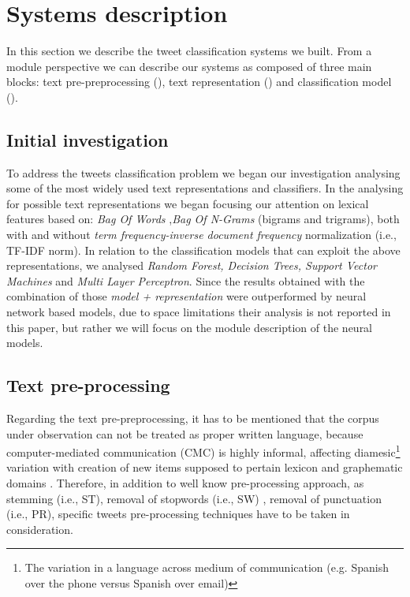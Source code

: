 \section{Systems description} \label{sec:system}

In this section we describe the tweet classification systems we built. From a module perspective we can describe our systems as composed of three main blocks: text pre-preprocessing (),  text representation () and classification model (). 


\subsection{Initial investigation} \label{subsec:boh}
To address the tweets classification problem we began our investigation analysing some of the most widely used text representations and classifiers.
In the analysing for possible text representations we began focusing our attention on lexical features based on: \emph{Bag Of Words} \cite{harris1954distributional},\emph{Bag Of N-Grams} (bigrams and trigrams), both with and without \emph{term frequency-inverse document frequency} normalization (i.e., TF-IDF norm).
In relation to the classification models that can exploit the above representations,  we analysed \emph{Random Forest, Decision Trees, Support Vector Machines} and \emph{Multi Layer Perceptron}. Since the results obtained with the combination of those \emph{model + representation} were outperformed by neural network based models, due to space limitations their analysis is not reported in this paper, but rather we will focus on the module description of the neural models.


\subsection{Text pre-processing} \label{subsec:preprocessing}
Regarding the text pre-preprocessing, it has to be mentioned that the corpus under observation can not be treated as proper written language, because computer-mediated communication (CMC) is highly informal, affecting diamesic\footnote{The variation in a language across medium of communication (e.g. Spanish over the phone versus Spanish over email)} variation with creation of new items supposed to pertain lexicon and graphematic domains \cite{bazzanella2011oscillazioni,cerruti2013netspeak}.
Therefore, in addition to well know pre-processing approach, as stemming (i.e., ST), removal of stopwords (i.e., SW) , removal of punctuation (i.e., PR), specific tweets pre-processing techniques have to be taken in consideration.


